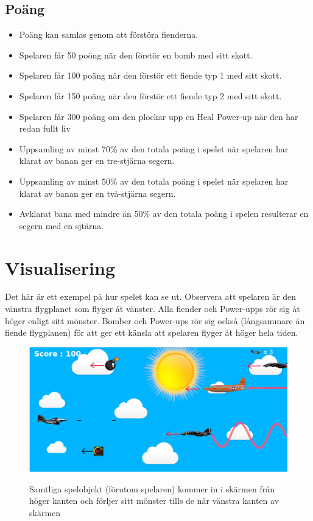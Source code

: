 \documentclass{TDP005mall}
\begin{document}
\subsection{Poäng}
\begin{itemize}
\item Poäng kan samlas genom att förstöra fienderna.
\item Spelaren får 50 poöng när den förstör en bomb med sitt skott.
\item Spelaren får 100 poäng när den förstör ett fiende typ 1 med sitt skott.
\item Spelaren får 150 poäng när den förstör ett fiende typ 2 med sitt skott.
\item Spelaren får 300 poäng om den plockar upp en Heal Power-up när den har redan fullt liv  
\item Uppsamling av minst 70\% av den totala poäng i spelet när spelaren har klarat av banan ger en tre-stjärna segern.
\item Uppsamling av minst 50\% av den totala poäng i spelet när spelaren har klarat av banan ger en två-stjärna segern.
\item Avklarat bana med mindre än 50\% av den totala poäng i spelen resulterar en segern med en sjtärna.

\end{itemize}

\section{Visualisering}
Det här är ett exempel på hur spelet kan se ut. Observera att spelaren är den vänstra flygplanet som flyger åt vänster. Alla fiender och Power-upps rör sig åt höger enligt sitt mönster. Bomber och Power-ups rör sig också (långsammare än fiende flygplanen) för att ger ett känsla att spelaren flyger åt höger hela tiden.

\begin{figure}[h!]
  \centering
  \includegraphics[scale=0.35]{Images/Game.png}
  \label{Bild 3}
  \caption{Samtliga spelobjekt (förutom spelaren) kommer in i skärmen från höger kanten och förljer sitt mönster tills de når vänstra kanten av skärmen}
\end{figure}
\end{document}

